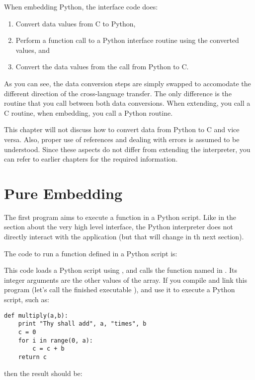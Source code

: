 When embedding Python, the interface code does:

\begin{enumerate}
    \item Convert data values from C to Python,
    \item Perform a function call to a Python interface routine
        using the converted values, and
    \item Convert the data values from the call from Python to C.
\end{enumerate}

As you can see, the data conversion steps are simply swapped to
accomodate the different direction of the cross-language transfer.
The only difference is the routine that you call between both
data conversions. When extending, you call a C routine, when
embedding, you call a Python routine.

This chapter will not discuss how to convert data from Python
to C and vice versa.  Also, proper use of references and dealing
with errors is assumed to be understood.  Since these aspects do not
differ from extending the interpreter, you can refer to earlier
chapters for the required information.


\section{Pure Embedding
         \label{pure-embedding}}

The first program aims to execute a function in a Python
script. Like in the section about the very high level interface,
the Python interpreter does not directly interact with the
application (but that will change in th next section).

The code to run a function defined in a Python script is:



This code loads a Python script using , and calls the
function named in .  Its integer arguments are the other
values of the  array.  If you compile and link this
program (let's call the finished executable ), and use
it to execute a Python script, such as:

\begin{verbatim}
def multiply(a,b):
    print "Thy shall add", a, "times", b
    c = 0
    for i in range(0, a):
        c = c + b
    return c
\end{verbatim}

then the result should be:

